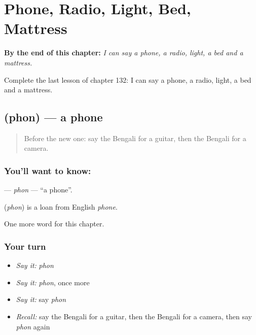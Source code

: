 
\chapter{Phone, Radio, Light, Bed, Mattress}
\label{ch:bn-phone-radio-light-bed-mattress}

\begin{chapteropening}
\textbf{By the end of this chapter:} \emph{I can say a phone, a radio, light, a bed and a mattress.}

Complete the last lesson of chapter 132: I can say a phone, a radio, light, a bed and a mattress.
\end{chapteropening}

\section[\texorpdfstring{\bn{ফোন} (phon)}{ফোন (phon)}]{ (phon) — a phone}

\label{lesson:BN-C132-phon}



\begin{quote}
Before the new one: say the Bengali for a guitar, then the Bengali for a camera.
\end{quote}

\subsection*{You'll want to know: }
\textbf{} — \emph{phon} — \textquotedblleft{}a phone\textquotedblright{}.

\begin{cousinweb}
\textbf{} (\emph{phon}) is a loan from English \emph{phone}.
\end{cousinweb}

\begin{grammarlens}[title={What you've built}]
One more word for this chapter.
\end{grammarlens}

\subsection*{Your turn}
\begin{itemize}
\raggedright
  \item \emph{Say it:} \emph{phon}
  \item \emph{Say it:} \emph{phon}, once more
  \item \emph{Say it:} say \emph{phon}
  \item \emph{Recall:} say the Bengali for a guitar, then the Bengali for a camera, then say \emph{phon} again
\end{itemize}

